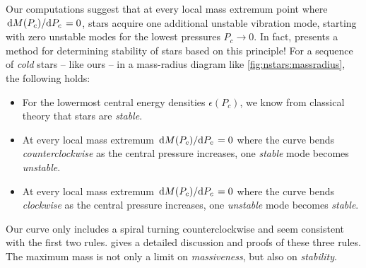 Our computations suggest that at every local mass extremum point where $\odv{M(P_c)}/{P_c} = 0$, stars acquire one additional unstable vibration mode, starting with zero unstable modes for the lowest pressures $P_c \rightarrow 0$.
In fact, \cite{ref:stability_methods} presents a method for determining stability of stars based on this principle!
For a sequence of \emph{cold} stars -- like ours -- in a mass-radius diagram like \cref{fig:nstars:massradius}, the following holds:
\begin{itemize}
\item For the lowermost central energy densities $\epsilon(P_c)$, we know from classical theory that stars are \emph{stable}.
\item At every local mass extremum $\odv{M(P_c)}/{P_c} = 0$ where the curve bends \emph{counterclockwise} as the central pressure increases, one \emph{stable} mode becomes \emph{unstable}.
\item At every local mass extremum $\odv{M(P_c)}/{P_c} = 0$ where the curve bends \emph{clockwise} as the central pressure increases, one \emph{unstable} mode becomes \emph{stable}.
\end{itemize}
Our curve only includes a spiral turning counterclockwise and seem consistent with the first two rules.
\cite{ref:stability_rules_thorne} gives a detailed discussion and proofs of these three rules.
The maximum mass is not only a limit on \emph{massiveness}, but also on \emph{stability}.


